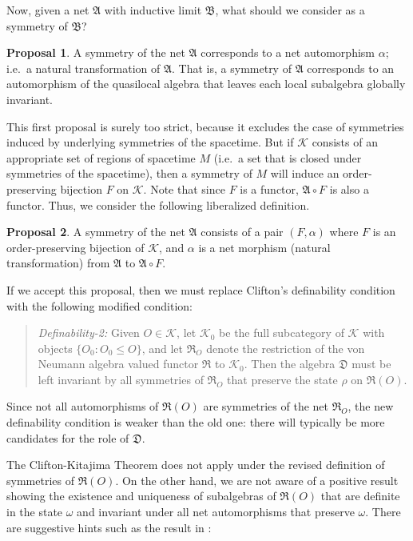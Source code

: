 \documentclass[11pt]{article}
\newcommand{\alg}[1]{\mathfrak{#1}}
\theoremstyle{definition}
\newtheorem{proposal}{Proposal}
\theoremstyle{definition}
\theoremstyle{remark}
\def\2#1{{\mathcal #1}}
\def\al#1{{\mathfrak #1}}
\def\a{\alpha} \def\b{\beta} \def\g{\gamma} \def\d{\delta}
\def\om{\omega} \def\Om{\Omega} \def\dd{\partial} \def\D{\Delta}
\begin{document}
Now, given a net $\alg{A}$ with inductive limit $\alg{B}$, what should we consider as
a symmetry of $\alg{B}$?

\begin{proposal} A symmetry of the net $\alg{A}$ corresponds to a net
  automorphism $\a$; i.e.\ a natural transformation of $\alg{A}$.
  That is, a symmetry of $\alg{A}$ corresponds to an automorphism of
  the quasilocal algebra that leaves each local subalgebra globally
  invariant.
\end{proposal}

This first proposal is surely too strict, because it excludes the case
of symmetries induced by underlying symmetries of the spacetime.  But
if $\2K$ consists of an appropriate set of regions of spacetime $M$
(i.e.\ a set that is closed under symmetries of the spacetime), then a
symmetry of $M$ will induce an order-preserving bijection $F$ on
$\2K$.  Note that since $F$ is a functor, $\alg{A}\circ F$ is also a
functor.  Thus, we consider the following liberalized definition.

\begin{proposal} A symmetry of the net $\alg{A}$ consists of a pair $(F,\a )$ where
  $F$ is an order-preserving bijection of $\2K$, and $\a$ is a net morphism (natural
  transformation) from $\alg{A}$ to $\alg{A}\circ F$.
\end{proposal}

If we accept this proposal, then we must replace Clifton's definability condition
with the following modified condition:

\begin{quote} \textit{Definability-2:} Given $O\in \2K$, let $\2K _0$
  be the full subcategory of $\2K$ with objects $\{ O_0:O_0\leq O \}$,
  and let $\alg{R}_{O}$ denote the restriction of the von Neumann
  algebra valued functor $\alg{R}$ to $\2K _0$.  Then the algebra
  $\alg{D}$ must be left invariant by all symmetries of $\alg{R}_O$
  that preserve the state $\rho$ on $\alg{R}(O)$.
\end{quote} Since not all automorphisms of $\alg{R}(O)$ are symmetries of the net
$\alg{R}_O$, the new definability condition is weaker than the old one: there will
typically be more candidates for the role of $\alg{D}$.   

The Clifton-Kitajima Theorem does not apply under the revised
definition of symmetries of $\al R(O)$.  On the other hand, we are not
aware of a positive result showing the existence and uniqueness of
subalgebras of $\al R(O)$ that are definite in the state $\om$ and
invariant under all net automorphisms that preserve $\om$.  There are
suggestive hints such as the result in \cite{split}:
\end{document}
